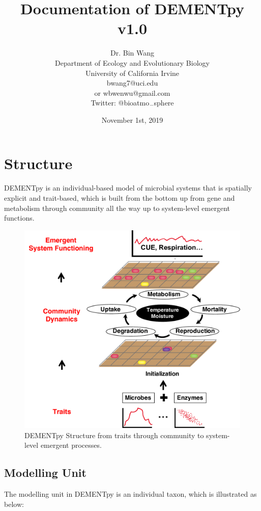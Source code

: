 \documentclass[12pt, oneside, titlepage]{article}   	%
\title{\textbf{Documentation of DEMENTpy v1.0}}
\author{Dr. Bin Wang\\
Department of Ecology and Evolutionary Biology\\
University of California Irvine\\
bwang7@uci.edu\\
or wbwenwu@gmail.com\\
Twitter: {@bioatmo$\rule{2mm}{0.1mm}$sphere}}
\date{November 1st, 2019}
\begin{document}
\maketitle

\section{Structure}
DEMENTpy is an individual-based model of microbial systems that is spatially explicit and trait-based, which is built from the bottom up from gene and metabolism through community all the way up to system-level emergent functions.  

\begin{figure}[H]
  \centering
  \includegraphics[width=\linewidth]{Fig1_Structure.pdf}
  \caption{DEMENTpy Structure from traits through community to system-level emergent processes.}
  \label{fig:structure}
\end{figure}

\subsection{Modelling Unit}
The modelling unit in DEMENTpy is an individual taxon, which is illustrated as below:

\end{document}
